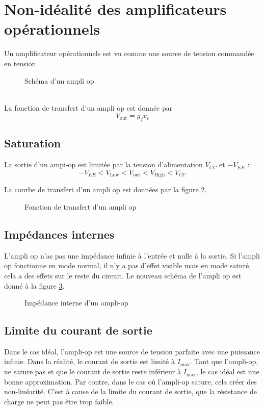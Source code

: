 \section{Non-idéalité des amplificateurs opérationnels}
Un amplificateur opérationnels est vu comme une source de tension commandée en tension
\begin{figure} [!h]
\centering

\caption{\label{schema_op_amp} Schéma d'un ampli op}
\end{figure} 
\\La fonction de transfert d'un ampli op est donnée par
\begin{equation}
V_\text{out} = g_fv_\varepsilon
\end{equation}
\subsection{Saturation}
La sortie d'un ampi-op est limitée par la tension d'alimentation $V_{CC}$ et $-V_{EE}$ : 
$$-V_{EE} < V_\text{Low} < V_\text{out} < V_\text{High} < V_{CC} $$

La courbe de transfert d'un ampli op est données par la figure \ref{fig:saturation}.
\begin{figure} [!h]
\centering

\caption{\label{fig:saturation}Fonction de transfert d'un ampli op}
\end{figure}

\subsection{Impédances internes}
L'ampli op n'as pas une impédance infinie à l'entrée et nulle à la sortie. Si l'ampli op fonctionne en mode normal, il n'y a pas d'effet visible mais en mode saturé, cela a des effets sur le reste du circuit.
Le nouveau schéma de l'ampli op est donné à la figure \ref{fig:internal_impedance_op-amp}.
\begin{figure}[!h]
	\centering
	
	\caption{\label{fig:internal_impedance_op-amp}Impédance interne d'un ampli-op}
\end{figure}
\subsection{Limite du courant de sortie}
Dans le cas idéal, l'ampli-op est une source de tension parfaite avec une puissance infinie. Dans la réalité, le courant de sortie est limité à $I_\text{max}$. Tant que l'ampli-op, ne sature pas et que le courant de sortie reste inférieur à $I_\text{max}$, le cas idéal est une bonne approximation. Par contre, dans le cas où l'ampli-op sature, cela créer des non-linéarité. C'est à cause de la limite du courant de sortie, que la résistance de charge ne peut pas être trop faible.
